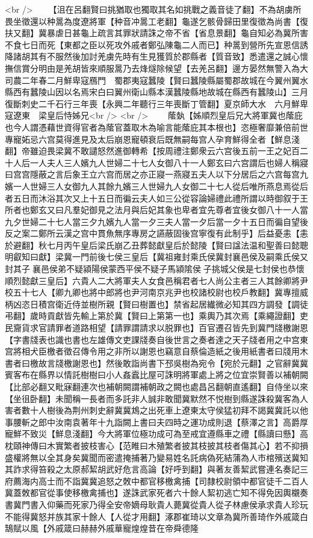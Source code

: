 <br />
　　【沮在呂翻賢曰挑猶取也獨取其名如挑戰之義音徒了翻】不為胡虜所畏坐徵還以种暠為度遼將軍【种音冲暠工老翻】龜遂乞骸骨歸田里復徵為尚書【復扶又翻】冀暴虐日甚龜上疏言其罪狀請誅之帝不省【省息景翻】龜自知必為冀所害不食七日而死【東都之臣以死攻外戚者鄭弘陳龜二人而已】种暠到營所先宣恩信誘降諸胡其有不服然後加討羌虜先時有生見獲質於郡縣者【質音致】悉遣還之誠心懷撫信賞分明由是羌胡皆來順服暠乃去烽燧除候望【去羌呂翻】邊方晏然無警入為大司農二年春二月鮮卑寇鴈門　蜀郡夷寇蠶陵【賢曰蠶陵縣屬蜀郡故城在今翼州翼水縣西有蠶陵山因以名焉宋白曰翼州衛山縣本漢蠶陵縣地故城在縣西有蠶陵山】三月復斷刺史二千石行三年喪【永興二年聽行三年喪斷丁管翻】夏京師大水　六月鮮卑寇遼東　梁皇后恃姊兄<br />
<br />
　　䕃埶【姊順烈皇后兄大將軍冀也䕃庇也今人謂憑藉世資得官者為䕃官蓋取木為喻言能䕃庇其本根也】恣極奢靡兼倍前世專寵妬忌六宫莫得進見及太后崩恩寵頓衰后既無嗣每宫人孕育鮮得全者【鮮息淺翻】帝雖迫畏梁冀不敢譴怒然進御轉希【按周禮注鄭衆云六宫後五前一王之妃百二十人后一人夫人三人嬪九人世婦二十七人女御八十一人鄭玄曰六宫謂后也婦人稱寢曰宫宫隱蔽之言后象王立六宫而居之亦正寢一燕寢五夫人以下分居后之六宫每宫九嬪一人世婦三人女御九人其餘九嬪三人世婦九人女御二十七人從后唯所燕息焉從后者五日而沐浴其次又上十五日而徧云夫人如三公從容論婦禮此禮所謂以時御叙于王所者也鄭玄又曰凡羣妃御見之法月與后妃其象也卑者宜先尊者宜後女御八十一人當九夕世婦二十七人當三夕九嬪九人當一夕三夫人當一夕后當一夕十五日而徧自望後反之案二鄭所云漢之宫中貫魚無序專房之讌蔽固後宫寧復有此制乎】后益憂恚【恚於避翻】秋七月丙午皇后梁氏崩乙丑葬懿獻皇后於懿陵【賢曰諡法温和聖善曰懿聰明叡知曰獻】梁冀一門前後七侯三皇后【冀祖雍封乘氏侯冀封襄邑侯及嗣乘氏侯又封其子襄邑侯弟不疑潁陽侯蒙西平侯不疑子馬潁隂侯子挑城父侯是七封侯也恭懷順烈懿獻三皇后】六貴人二大將軍夫人女食邑稱君者七人尚公主者三人其餘卿將尹校五十七人【卿九卿也將中郎將也尹河南京兆尹也校諸校尉也校戶教翻】冀專擅威柄凶恣日積宫衛近侍並樹所親【賢曰樹置也】禁省起居纎微必知其四方調發【調徒弔翻】歲時貢獻皆先輸上第於冀【賢曰上第第一也】乘輿乃其次焉【乘繩證翻】吏民齎貨求官請罪者道路相望【請罪謂請求以脱罪也】百官遷召皆先到冀門牋檄謝恩【字書牋表也識也書也左雄傳文吏課牋奏自後世言之奏者達之天子牋者用之中宫東宫將相犬臣檄者徵召傳令用之非所以謝恩也竊意自蔡倫造紙之後用紙書者曰牋用木書者曰檄故言牋檄謝恩也】然後敢詣尚書下邳吳樹為宛令【宛於元翻】之官辭冀冀賓客布在縣界以情託樹樹曰小人姦蠧比屋可誅明將軍處上將之位宜崇賢善以補朝闕【比部必翻又毗寐翻連次也補朝闕謂補朝政之闕也處昌呂翻朝直遙翻】自侍坐以來【坐徂卧翻】未聞稱一長者而多託非人誠非敢聞冀默然不悦樹到縣遂誅殺冀客為人害者數十人樹後為荆州刺史辭冀冀鴆之出死車上遼東太守侯猛初拜不謁冀冀託以他事腰斬之郎中汝南袁著年十九詣闕上書曰夫四時之運功成則退【蔡澤之言】高爵厚寵鮮不致災【鮮息淺翻】今大將軍位極功成可為至戒宜遵縣車之禮【縣讀曰懸】高枕頤神傳曰木實繁者披枝害心【范睢曰木殖繁者披其枝披其枝者傷其心】若不抑損盛權將無以全其身矣冀聞而密遣掩捕著乃變易姓名託病偽死結蒲為人市棺殯送冀知其詐求得笞殺之太原郝絜胡武好危言高論【好呼到翻】與著友善絜武嘗連名奏記三府薦海内高士而不詣冀冀追怒之敇中都官移檄禽捕【司隸校尉領中都官徒千二百人冀蓋敇都官從事使移檄禽捕也】遂誅武家死者六十餘人絜初逃亡知不得免因輿櫬奏書冀門書入仰藥而死家乃得全安帝嫡母耿貴人薨冀從貴人從子林慮侯承求貴人珍玩不能得冀怒并族其家十餘人【人從才用翻】涿郡崔琦以文章為冀所善琦作外戚箴白鵠賦以風【外戚箴曰赫赫外戚華寵煌煌昔在帝舜德隆